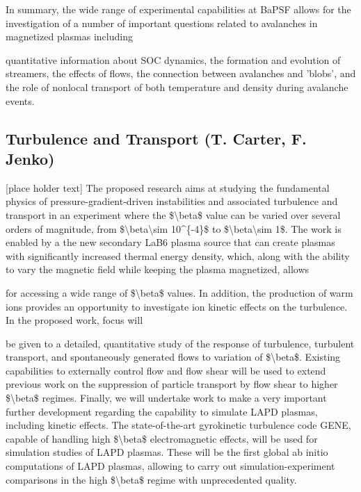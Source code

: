 \documentclass[11pt]{article}
\begin{document}
In summary, the wide range of experimental capabilities at BaPSF allows
for the investigation of a number of important questions related to
avalanches in magnetized plasmas including

quantitative information about SOC dynamics, the formation and evolution
of streamers, the effects of flows, the connection between avalanches
and 'blobs', and the role of nonlocal transport of both temperature and
density during avalanche events.


\subsection{Turbulence and Transport (T.
Carter, F. Jenko)}

{[}place holder text{]} The proposed research aims at studying the
fundamental physics of pressure-gradient-driven instabilities and
associated turbulence and transport in an experiment where the
\$\textbackslash{}beta\$ value can be varied over several orders of
magnitude, from \$\textbackslash{}beta\textbackslash{}sim 10\^{}\{-4\}\$
to \$\textbackslash{}beta\textbackslash{}sim 1\$. The work is enabled by
a the new secondary LaB6 plasma source that can create plasmas with
significantly increased thermal energy density, which, along with the
ability to vary the magnetic field while keeping the plasma magnetized,
allows

for accessing a wide range of \$\textbackslash{}beta\$ values. In
addition, the production of warm ions provides an opportunity to
investigate ion kinetic effects on the turbulence. In the proposed work,
focus will

be given to a detailed, quantitative study of the response of
turbulence, turbulent transport, and spontaneously generated flows to
variation of \$\textbackslash{}beta\$. Existing capabilities to
externally control flow and flow shear will be used to extend previous
work on the suppression of particle transport by flow shear to higher
\$\textbackslash{}beta\$ regimes. Finally, we will undertake work to
make a very important further development regarding the capability to
simulate LAPD plasmas, including kinetic effects. The state-of-the-art
gyrokinetic turbulence code GENE, capable of handling high
\$\textbackslash{}beta\$ electromagnetic effects, will be used for
simulation studies of LAPD plasmas. These will be the first global ab
initio computations of LAPD plasmas, allowing to carry out
simulation-experiment comparisons in the high \$\textbackslash{}beta\$
regime with unprecedented quality.
\end{document}
